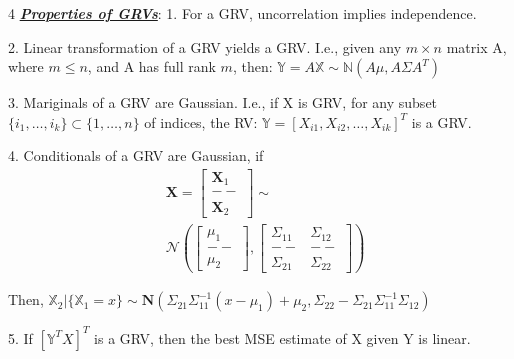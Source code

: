 \documentclass[12pt]{article}
\newcommand{\bulletPoint}[1]{\ul{\textit{\textbf{#1}}}}
\begin{document}
\begin{multicols*}{4}
\bulletPoint{Properties of GRVs}:
1. For a GRV, uncorrelation implies independence.

2. Linear transformation of a GRV yields a GRV. I.e., given any $m \times n$ matrix A, where $m \leq n$, and A has full rank $m$, then: $\mathbb{Y} = A\mathbb{X} \sim \mathbb{N}(A\mathbb{\mu}, A\Sigma A^T)$

3. Mariginals of a GRV are Gaussian. I.e., if X is GRV, for any subset $\{i_1, \ldots, i_k\} \subset \{1, \ldots, n\}$ of indices, the RV: $\mathbb{Y}=[X_{i1}, X_{i2}, \ldots, X_{ik}]^T$ is a GRV.

4. Conditionals of a GRV are Gaussian, if
\useshortskip\begin{equation*}
\begin{split}
& \mathbf{X}=\left[\begin{array}{c}
\mathbf{X}_1 \\
-- \\
\mathbf{X}_2
\end{array}\right] \sim \\
& \mathcal{N}\left(\left[\begin{array}{c}
\mu_1 \\
-- \\
\mu_2
\end{array}\right],\left[\begin{array}{c|c}
\Sigma_{11} & \Sigma_{12} \\
-- & -- \\
\Sigma_{21} & \Sigma_{22}
\end{array}\right]\right)
\end{split}
\end{equation*}

Then,  $\mathbb{X}_2|\{\mathbb{X}_1=x\} \sim \mathbf{N}(\Sigma_{21}\Sigma^{-1}_{11}(x-\mu_1)+\mu_2, \Sigma_{22}-\Sigma_{21}\Sigma^{-1}_{11}\Sigma_{12})$

5. If $[\mathbb{Y}^T X]^T$ is a GRV, then the best MSE estimate of X given Y is linear.



\end{multicols*}
\end{document}
